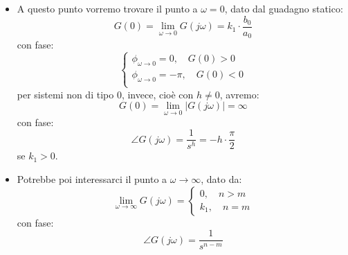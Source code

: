 \documentclass[a4paper,11pt]{article}
\begin{document}
\begin{enumerate}
		\begin{itemize}
			\item 
		A questo punto vorremo trovare il punto a $\omega = 0$, dato dal guadagno statico:
		$$
			G(0) = \lim_{\omega \rightarrow 0} G(j \omega) = k_1 \cdot \frac{b_0}{a_0}
		$$
		con fase:
		\[
			\begin{cases}
				\phi_{\omega \rightarrow 0} = 0, \quad G(0) > 0 \\	
				\phi_{\omega \rightarrow 0} = -\pi, \quad G(0) < 0 \\	
			\end{cases}
		\]
		per sistemi non di tipo $0$, invece, cioè con $h \neq 0$, avremo:
		$$
			G(0) = \lim_{\omega \rightarrow 0} |G(j\omega)| = \infty
		$$
		con fase:
		$$
		\angle G(j\omega) = \frac{1}{s^h} = -h \cdot \frac{\pi}{2}
		$$
		se $k_1 > 0$.
	\item 
		Potrebbe poi interessarci il punto a $\omega \rightarrow \infty$, dato da:
		\[
				\lim_{\omega \rightarrow \infty} G(j\omega) = 	
			\begin{cases}
				0, \quad n > m \\
				k_1, \quad n = m
			\end{cases}
		\]
		con fase:
		$$
		\angle G(j\omega) = \frac{1}{s^{n - m}}
		$$
\end{itemize}
\end{enumerate}
\end{document}
